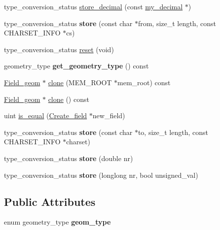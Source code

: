 \begin{DoxyCompactItemize}
\item 
type\+\_\+conversion\+\_\+status \mbox{\hyperlink{classField__geom_a898e7030c139559c40683399075788a5}{store\+\_\+decimal}} (const \mbox{\hyperlink{classmy__decimal}{my\+\_\+decimal}} $\ast$)
\item 
\mbox{\label{classField__geom_ad99f029c0eadc91d06564b5f261a2ed3}} 
type\+\_\+conversion\+\_\+status {\bfseries store} (const char $\ast$from, size\+\_\+t length, const C\+H\+A\+R\+S\+E\+T\+\_\+\+I\+N\+FO $\ast$cs)
\item 
type\+\_\+conversion\+\_\+status \mbox{\hyperlink{classField__geom_a029dfebc6f8ceb3b00f74be7c191a7d4}{reset}} (void)
\item 
\mbox{\label{classField__geom_aeb741adaee764002d5c8bba507b2b942}} 
geometry\+\_\+type {\bfseries get\+\_\+geometry\+\_\+type} () const
\item 
\mbox{\hyperlink{classField__geom}{Field\+\_\+geom}} $\ast$ \mbox{\hyperlink{classField__geom_a79a6e5a31b39dbaddfef43ede4d82d40}{clone}} (M\+E\+M\+\_\+\+R\+O\+OT $\ast$mem\+\_\+root) const
\item 
\mbox{\hyperlink{classField__geom}{Field\+\_\+geom}} $\ast$ \mbox{\hyperlink{classField__geom_ae0cdd2368852aafe6b325756ba3b5a24}{clone}} () const
\item 
uint \mbox{\hyperlink{classField__geom_a20953b29b4a85e8d77f16593313fd381}{is\+\_\+equal}} (\mbox{\hyperlink{classCreate__field}{Create\+\_\+field}} $\ast$new\+\_\+field)
\item 
\mbox{\label{classField__geom_a8a52e2ffe708bc6e95114d4159c3a671}} 
type\+\_\+conversion\+\_\+status {\bfseries store} (const char $\ast$to, size\+\_\+t length, const C\+H\+A\+R\+S\+E\+T\+\_\+\+I\+N\+FO $\ast$charset)
\item 
\mbox{\label{classField__geom_a2bc7bea5075f5ebbee1a11c13e37b5b2}} 
type\+\_\+conversion\+\_\+status {\bfseries store} (double nr)
\item 
\mbox{\label{classField__geom_a8298ba21e81a9a9c38af09b1b69286bf}} 
type\+\_\+conversion\+\_\+status {\bfseries store} (longlong nr, bool unsigned\+\_\+val)
\end{DoxyCompactItemize}
\subsection*{Public Attributes}
\begin{DoxyCompactItemize}
\item 
\mbox{\label{classField__geom_a1853977f0de308b12418a43fbb78e0ac}} 
enum geometry\+\_\+type {\bfseries geom\+\_\+type}
\end{DoxyCompactItemize}
